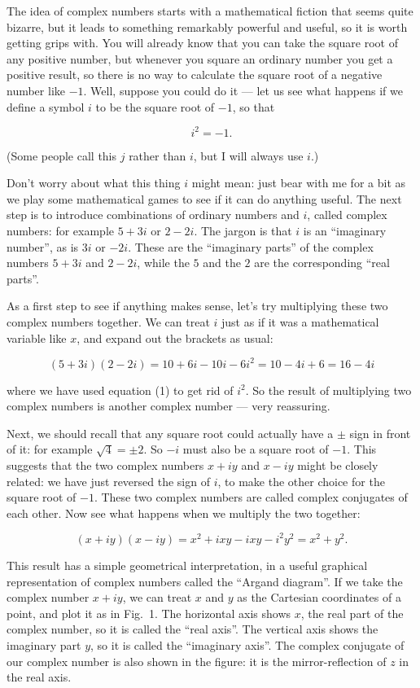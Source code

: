   The idea of complex numbers starts with a mathematical fiction that seems 
  quite bizarre, but it leads to something remarkably powerful and useful, so 
  it is worth getting grips with. You will already know that you can take the 
  square root of any positive number, but whenever you square an ordinary 
  number you get a positive result, so there is no way to calculate the square 
  root of a negative number like $-1$. Well, suppose you could do it --- let us 
  see what happens if we define a symbol $i$ to be the square root of $-1$, so 
  that 

  $$i^2=-1 . \tag{1}$$ 

  (Some people call this $j$ rather than $i$, but I will always use $i$.) 

  Don't worry about what this thing $i$ might mean: just bear with me for a bit 
  as we play some mathematical games to see if it can do anything useful. The 
  next step is to introduce combinations of ordinary numbers and $i$, called 
  complex numbers: for example $5+3i$ or $2-2i$. The jargon is that $i$ is an 
  ``imaginary number'', as is $3i$ or $-2i$. These are the ``imaginary parts'' 
  of the complex numbers $5+3i$ and $2-2i$, while the $5$ and the $2$ are the 
  corresponding ``real parts''. 

  As a first step to see if anything makes sense, let's try multiplying these 
  two complex numbers together. We can treat $i$ just as if it was a 
  mathematical variable like $x$, and expand out the brackets as usual: 

  $$(5+3i)(2-2i) = 10 +6i -10i -6 i^2=10 -4i +6 = 16-4i \tag{2}$$ 

  where we have used equation (1) to get rid of $i^2$. So the result of 
  multiplying two complex numbers is another complex number --- very 
  reassuring. 

  Next, we should recall that any square root could actually have a $\pm$ sign 
  in front of it: for example $\sqrt{4}=\pm2$. So $-i$ must also be a square 
  root of $-1$. This suggests that the two complex numbers $x+iy$ and $x-iy$ 
  might be closely related: we have just reversed the sign of $i$, to make the 
  other choice for the square root of $-1$. These two complex numbers are 
  called complex conjugates of each other. Now see what happens when we 
  multiply the two together: 

  $$(x+iy)(x-iy)=x^2 +ixy -ixy -i^2 y^2 = x^2 + y^2. \tag{3}$$ 

  This result has a simple geometrical interpretation, in a useful graphical 
  representation of complex numbers called the ``Argand diagram''. If we take 
  the complex number $x+iy$, we can treat $x$ and $y$ as the Cartesian 
  coordinates of a point, and plot it as in Fig.\ 1. The horizontal axis shows 
  $x$, the real part of the complex number, so it is called the ``real axis''. 
  The vertical axis shows the imaginary part $y$, so it is called the 
  ``imaginary axis''. The complex conjugate of our complex number is also shown 
  in the figure: it is the mirror-reflection of $z$ in the real axis. 

